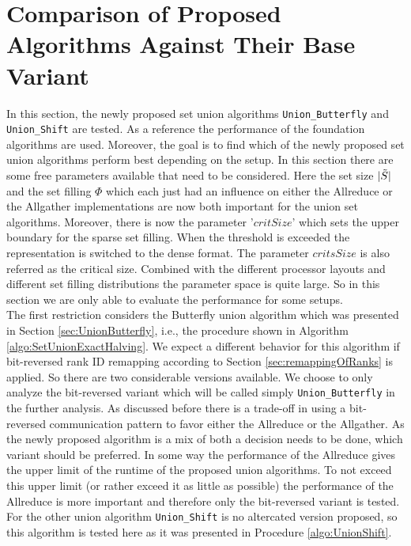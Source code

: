 \section{Comparison of Proposed Algorithms Against Their Base Variant}
In this section, the newly proposed set union algorithms \texttt{Union\_Butterfly} and \texttt{Union\_Shift} are tested.  As a reference the performance of the foundation algorithms are used. Moreover, the goal is to find which of the newly proposed set union algorithms perform best depending on the setup. In this section there are some free parameters available that need to be considered. Here the set size $|\Tilde{S}|$ and the set filling $\Phi$ which each just had an influence on either the Allreduce or the Allgather implementations are now both important for the union set algorithms. Moreover, there is now the parameter '$critSize$' which sets the upper boundary for the sparse set filling. When the threshold is exceeded the representation is switched to the dense format. The parameter $critsSize$ is also referred as the critical size. Combined with the different processor layouts and different set filling distributions the parameter space is quite large. So in this section we are only able to evaluate the performance for some setups.\\
The first restriction considers the Butterfly union algorithm which was presented in Section \ref{sec:UnionButterfly}, i.e., the procedure shown in Algorithm \ref{algo:SetUnionExactHalving}. We expect a different behavior for this algorithm if bit-reversed rank ID remapping according to Section \ref{sec:remappingOfRanks} is applied.  So there are two considerable versions available. We choose to only analyze the bit-reversed variant which will be called simply \texttt{Union\_Butterfly} in the further analysis. As discussed before there is a trade-off in using a bit-reversed communication pattern to favor either the Allreduce or the Allgather. As the newly proposed algorithm is a mix of both a decision needs to be done, which variant should be preferred. In some way the performance of the Allreduce gives the upper limit of the runtime of the proposed union algorithms. To not exceed this upper limit (or rather exceed it as little as possible) the performance of the Allreduce is more important and therefore only the bit-reversed variant is tested.\\
For the other union algorithm \texttt{Union\_Shift} is no altercated version proposed, so this algorithm is tested here as it was presented in Procedure \ref{algo:UnionShift}.\\
